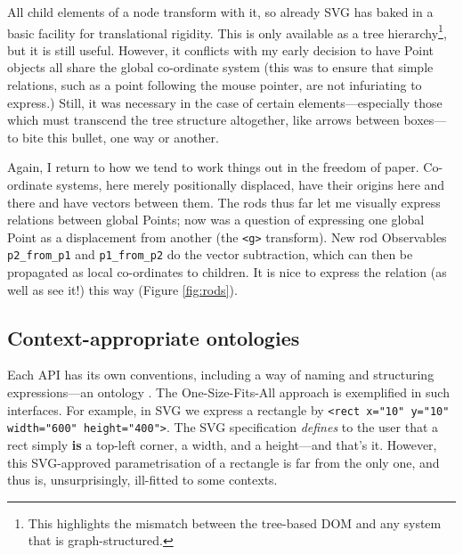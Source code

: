 All child elements of a node transform with it, so already SVG has baked
in a basic facility for translational rigidity. This is only available
as a tree hierarchy\footnote{This highlights the mismatch between the
  tree-based DOM and any system that is graph-structured.}, but it is
still useful. However, it conflicts with my early decision to have Point
objects all share the global co-ordinate system (this was to ensure that
simple relations, such as a point following the mouse pointer, are not
infuriating to express.) Still, it was necessary in the case of certain
elements---especially those which must transcend the tree structure
altogether, like arrows between boxes---to bite this bullet, one way or
another.

Again, I return to how we tend to work things out in the freedom of
paper. Co-ordinate systems, here merely positionally displaced, have
their origins here and there and have vectors between them. The rods
thus far let me visually express relations between global Points; now
was a question of expressing one global Point as a displacement from
another (the \texttt{\textless{}g\textgreater{}} transform). New rod
Observables \texttt{p2\_from\_p1} and \texttt{p1\_from\_p2} do the
vector subtraction, which can then be propagated as local co-ordinates
to children. It is nice to express the relation (as well as see it!)
this way (Figure \ref{fig:rods}).

\hypertarget{context-appropriate-ontologies}{%
\subsection{Context-appropriate
ontologies}\label{context-appropriate-ontologies}}

Each API has its own conventions, including a way of naming and
structuring expressions---an ontology \cite{crit-semprola}. The
One-Size-Fits-All{} approach is exemplified in such interfaces. For
example, in SVG we express a rectangle by
\texttt{\textless{}rect x="10" y="10" width="600" height="400"\textgreater{}}.
The SVG specification \emph{defines} to the user that a rect simply
\textbf{is} a top-left corner, a width, and a height---and that's it.
However, this SVG-approved parametrisation of a rectangle is far from
the only one, and thus is, unsurprisingly, ill-fitted to some contexts.

